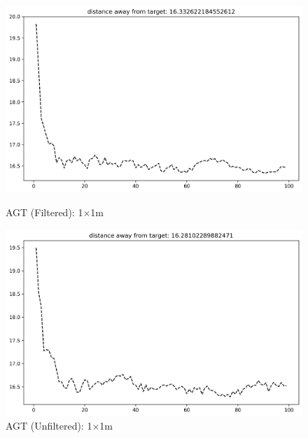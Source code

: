 \documentclass[runningheads]{llncs}
\begin{document}
\begin{figure}[H]
	\centering
	\begin{minipage}{0.49\textwidth}
		\centering
		\includegraphics[width=\textwidth]{figures/filtered/xgb_softmax_custom_1.png}
		\caption*{AGT (Filtered): 1×1m}
	\end{minipage}
	\hfill
	\begin{minipage}{0.49\textwidth}
		\centering
		\includegraphics[width=\textwidth]{figures/unfiltered/xgb_softmax_custom_1.png}
		\caption*{AGT (Unfiltered): 1×1m}
	\end{minipage}
\end{figure}
\end{document}
